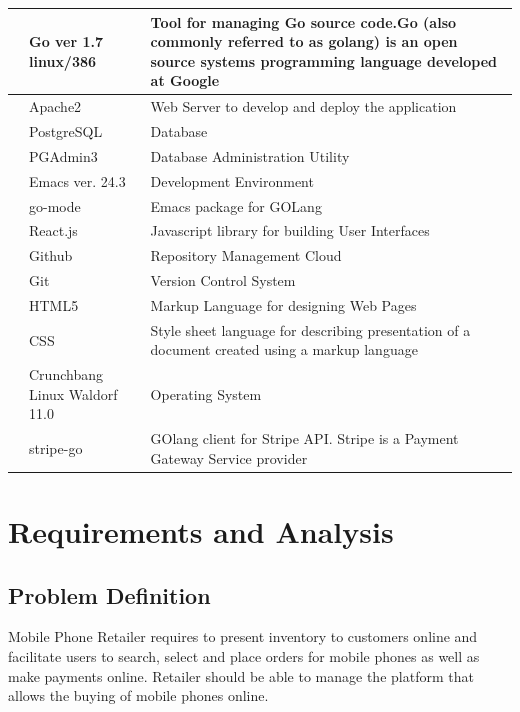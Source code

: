 \documentclass[hidelinks,a4paper,12pt]{article}
\begin{document}
\begin{center}
{\begin{tabularx}{\textwidth}{ | >{\ttfamily\raggedright\arraybackslash} s 
		  | >{\ttfamily\raggedright\arraybackslash} t 
		  | >{\ttfamily\raggedright\arraybackslash} t | }
		 & Go ver 1.7 linux/386 & Tool for managing Go source code.Go (also commonly referred to as golang) is an open source systems programming language developed at Google  \\
	     & Apache2 & Web Server to develop and deploy the application  \\
	     & PostgreSQL & Database  \\ [1em]
	     & PGAdmin3 & Database Administration Utility  \\  [1em]
	     & Emacs ver. 24.3 & Development Environment  \\ 
	     & go-mode & Emacs package for GOLang \\ [1em]
	     & React.js & Javascript library for building User Interfaces \\ [1em]
	     & Github & Repository Management Cloud  \\ [1em]
	     & Git & Version Control System  \\ [1em]
	     & HTML5 & Markup Language for designing Web Pages  \\ [1em]
	     & CSS & Style sheet language for describing presentation of a document created using a markup language  \\ [1em]
	     & Crunchbang Linux Waldorf 11.0 & Operating System   \\ 
	     & stripe-go & GOlang client for Stripe API. Stripe is a Payment Gateway Service provider   \\ 
	    \hline	   	    		       	           								
		\end{tabularx}
		}
		\end{center}
						
		\noindent
						

\bigskip

\newpage

\section{Requirements and Analysis}

\subsection{Problem Definition}
Mobile Phone Retailer requires to present inventory to customers online and facilitate users to search, select and place orders for mobile phones as well as make payments online.
Retailer should be able to manage the platform that allows the buying of mobile phones online.
\end{document}
